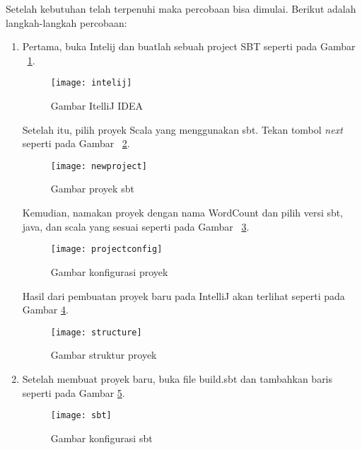 Setelah kebutuhan telah terpenuhi maka percobaan bisa dimulai. Berikut adalah langkah-langkah percobaan:

\begin{enumerate}

\item Pertama, buka Intelij dan buatlah sebuah project SBT seperti pada Gambar ~\ref{fig:intelij}.

\begin{figure}[H]
    \centering  
    \texttt{[image: intelij]}  
    \caption[Gambar ItelliJ IDEA]{Gambar ItelliJ IDEA} 
    \label{fig:intelij} 
\end{figure}

Setelah itu, pilih proyek Scala yang menggunakan sbt. Tekan tombol \textit{next} seperti pada Gambar ~\ref{fig:newproject}.

\begin{figure}[H]
    \centering  
    \texttt{[image: newproject]}  
    \caption[Gambar proyek sbt]{Gambar proyek sbt} 
    \label{fig:newproject} 
\end{figure}

Kemudian, namakan proyek dengan nama WordCount dan pilih versi sbt, java, dan scala yang sesuai seperti pada Gambar ~\ref{fig:projectconfig}. 

\begin{figure}[H]
    \centering  
    \texttt{[image: projectconfig]}  
    \caption[Gambar konfigurasi proyek]{Gambar konfigurasi proyek} 
    \label{fig:projectconfig} 
\end{figure}

Hasil dari pembuatan proyek baru pada IntelliJ akan terlihat seperti pada Gambar \ref{fig:structure}.

\begin{figure}[H]
    \centering  
    \texttt{[image: structure]}  
    \caption[Gambar struktur proyek ]{Gambar struktur proyek} 
    \label{fig:structure} 
\end{figure}

\item Setelah membuat proyek baru, buka file build.sbt dan tambahkan baris seperti pada Gambar \ref{fig:sbt}.


\begin{figure}[H]
    \centering  
    \texttt{[image: sbt]}  
    \caption[Gambar konfigurasi sbt]{Gambar konfigurasi sbt} 
    \label{fig:sbt} 
\end{figure}


\end{enumerate}
